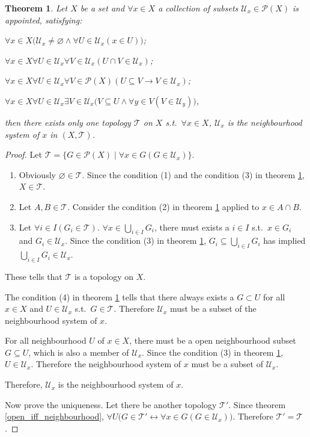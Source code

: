 \documentclass[openany]{book}
\theoremstyle{plain}
\newtheorem{theorem}{Theorem}[section] %
\theoremstyle{definition}
\begin{document}
\begin{theorem}\label{topology_built_on_neighbourhood}
Let $X$ be a set and $\forall x \in X$ a collection of subsets $\mathscr U_x \in \mathscr P(X)$ is appointed, satisfying:
\begin{conditionlist}[label=(\arabic*)]
\item $\forall x\in X\big(
	\mathscr U_x \neq \varnothing \wedge
		\forall U\in \mathscr U_x (x\in U)\big)$; 
\item $\forall x\in X\forall U\in\mathscr U_x\forall V\in\mathscr U_x (
	U\cap V\in \mathscr U_x)$;
\item $\forall x\in X\forall U\in\mathscr U_x\forall V\in \mathscr P(X)( 
	U\subseteq V \to V\in \mathscr U_x)$;
\item $\forall x\in X\forall U\in\mathscr U_x\exists V\in\mathscr U_x \big(
	V\subseteq U \wedge \forall y\in V(V\in \mathscr U_y)\big)$,
\end{conditionlist}
then there exists only one topology $\mathscr T$ on $X$ s.t.\ $\forall x\in X$, $\mathscr U_x$ is the neighbourhood system of $x$ in $(X,\mathscr T)$.
\end{theorem}
\begin{proof}
Let $\mathscr T = \{G\in \mathscr P(X) \mid \forall x\in G( G\in \mathscr U_x)\}$.
\begin{enumerate}[label=\alph*)]
\item Obviously $\varnothing \in \mathscr T$. 
	Since the condition (1) and the condition (3) in theorem \ref{topology_built_on_neighbourhood}, $X\in \mathscr T$.
\item Let $A, B\in \mathscr T$. Consider the condition (2) in theorem \ref{topology_built_on_neighbourhood} applied to $x\in A\cap B$.
\item Let $\forall i\in I( G_i \in \mathscr T)$. 
$\forall x\in \bigcup_{i\in I} G_i$, there must exists a $i\in I$ s.t.\ $x\in G_i$ and $G_i \in \mathscr U_x$. 
Since the condition (3) in theorem \ref{topology_built_on_neighbourhood}, $G_i \subseteq \bigcup_{i\in I} G_i$ has implied $\bigcup_{i\in I} G_i \in \mathscr U_x$.
\end{enumerate}
These tells that $\mathscr T$ is a topology on $X$.

The condition (4) in theorem \ref{topology_built_on_neighbourhood} tells that there always exists a $G\subset U$ for all $x\in X$ and $U\in \mathscr U_x$ s.t.\ $G\in \mathscr T$. Therefore $\mathscr U_x$ must be a subset of the neighbourhood system of $x$. 

For all neighbourhood $U$ of $x\in X$, there must be a open neighbourhood subset $G\subseteq U$, which is also a member of $\mathscr U_x$. Since the condition (3) in theorem \ref{topology_built_on_neighbourhood}, $U\in \mathscr U_x$. Therefore the neighbourhood system of $x$ must be a subset of $\mathscr U_x$. 

Therefore, $\mathscr U_x$ is the neighbourhood system of $x$.

Now prove the uniqueness. Let there be another topology $\mathscr T '$.
Since theorem \ref{open_iff_neighbourhood}, 
$\forall U\big(
	G\in \mathscr T' \leftrightarrow 
		\forall x\in G(
			G\in \mathscr U_x)\big)$. 
Therefore $\mathscr T' = \mathscr T$.
\end{proof}
\end{document}
